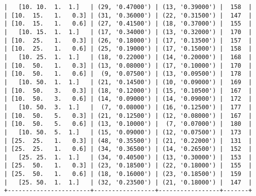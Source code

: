 \documentclass{article}
\begin{document}
\begin{verbatim}
|   [10. 10.  1.  1.]   | (29, '0.47000') | (13, '0.39000') |  158  |
| [10.  15.   1.   0.3] | (31, '0.36000') | (22, '0.31500') |  147  |
| [10.  15.   1.   0.6] | (27, '0.41500') | (18, '0.37000') |  155  |
|   [10. 15.  1.  1.]   | (17, '0.34000') | (13, '0.32000') |  170  |
| [10.  25.   1.   0.3] | (26, '0.18000') | (17, '0.13500') |  157  |
| [10.  25.   1.   0.6] | (25, '0.19000') | (17, '0.15000') |  158  |
|   [10. 25.  1.  1.]   | (18, '0.22000') | (14, '0.20000') |  168  |
| [10.  50.   1.   0.3] | (13, '0.08000') | (17, '0.10000') |  170  |
| [10.  50.   1.   0.6] |  (9, '0.07500') | (13, '0.09500') |  178  |
|   [10. 50.  1.  1.]   | (21, '0.14500') | (10, '0.09000') |  169  |
| [10.  50.   3.   0.3] | (18, '0.12000') | (15, '0.10500') |  167  |
| [10.  50.   3.   0.6] | (14, '0.09000') | (14, '0.09000') |  172  |
|   [10. 50.  3.  1.]   |  (7, '0.08000') | (16, '0.12500') |  177  |
| [10.  50.   5.   0.3] | (21, '0.12500') | (12, '0.08000') |  167  |
| [10.  50.   5.   0.6] | (13, '0.10000') |  (7, '0.07000') |  180  |
|   [10. 50.  5.  1.]   | (15, '0.09000') | (12, '0.07500') |  173  |
| [25.  25.   1.   0.3] | (48, '0.35500') | (21, '0.22000') |  131  |
| [25.  25.   1.   0.6] | (34, '0.36500') | (14, '0.26500') |  152  |
|   [25. 25.  1.  1.]   | (34, '0.40500') | (13, '0.30000') |  153  |
| [25.  50.   1.   0.3] | (23, '0.18500') | (22, '0.18000') |  155  |
| [25.  50.   1.   0.6] | (18, '0.16000') | (23, '0.18500') |  159  |
|   [25. 50.  1.  1.]   | (32, '0.23500') | (21, '0.18000') |  147  |
+-----------------------+-----------------+-----------------+-------+
\end{verbatim}
\end{document}
